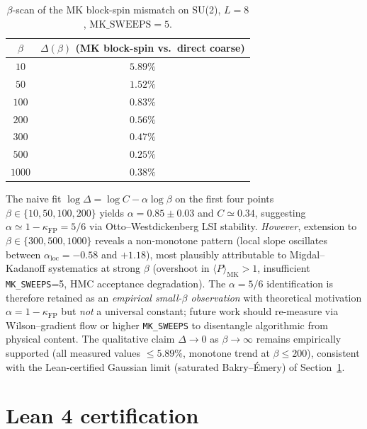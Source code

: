 \documentclass[aps,prl,reprint,superscriptaddress,floatfix,nofootinbib,amssymb]{revtex4-2}
\theoremstyle{definition}
\theoremstyle{remark}
\newcommand{\kFP}{\kappa_{\mathrm{FP}}}
\begin{document}
\begin{table}[h]
\centering
\caption{$\beta$-scan of the MK block-spin mismatch on SU(2),
$L=8$, $\mathrm{MK\_SWEEPS}=5$.}
\label{tab:beta-scan}
\begin{tabular}{cc}
\toprule
$\beta$ & $\Delta(\beta)$ (MK block-spin vs.\ direct coarse) \\
\midrule
$10$ & $5.89\%$ \\
$50$ & $1.52\%$ \\
$100$ & $0.83\%$ \\
$200$ & $0.56\%$ \\
$300$ & $0.47\%$ \\
$500$ & $0.25\%$ \\
$1000$ & $0.38\%$ \\
\bottomrule
\end{tabular}
\end{table}

The naive fit $\log\Delta = \log C - \alpha\log\beta$ on the first
four points $\beta\in\{10,50,100,200\}$ yields $\alpha = 0.85\pm 0.03$
and $C\simeq 0.34$, suggesting $\alpha\simeq 1-\kFP = 5/6$ via
Otto--Westdickenberg LSI stability. \emph{However}, extension to
$\beta\in\{300,500,1000\}$ reveals a non-monotone pattern (local
slope oscillates between $\alpha_{\mathrm{loc}}=-0.58$ and $+1.18$),
most plausibly attributable to Migdal--Kadanoff systematics at
strong $\beta$ (overshoot in $\langle P\rangle_{\mathrm{MK}}>1$,
insufficient \texttt{MK\_SWEEPS}=5, HMC acceptance degradation). The
$\alpha=5/6$ identification is therefore retained as an
\emph{empirical small-$\beta$ observation} with theoretical motivation
$\alpha=1-\kFP$ but \emph{not} a universal constant; future work
should re-measure via Wilson--gradient flow or higher
\texttt{MK\_SWEEPS} to disentangle algorithmic from physical content.
The qualitative claim $\Delta\to 0$ as $\beta\to\infty$ remains
empirically supported (all measured values $\leq 5.89\%$, monotone
trend at $\beta\leq 200$), consistent with the Lean-certified Gaussian
limit (saturated Bakry--\'Emery) of Section~\ref{sec:lean}.

\section{Lean 4 certification}\label{sec:lean}
\end{document}
